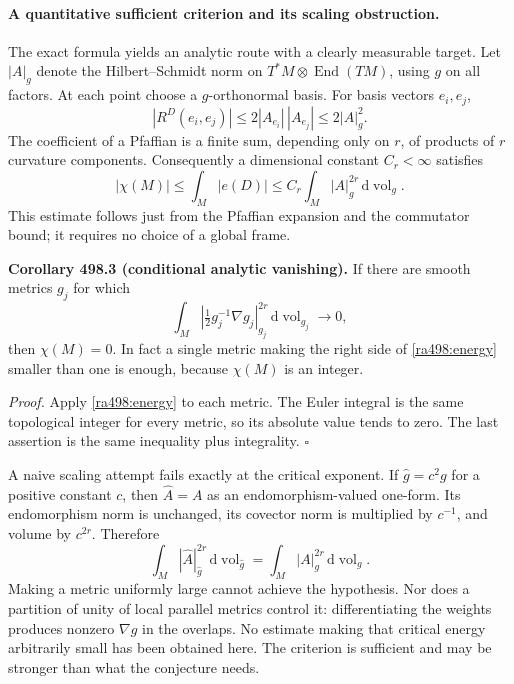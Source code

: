 \documentclass[11pt]{article}
\begin{document}
\paragraph{A quantitative sufficient criterion and its scaling obstruction.}
The exact formula yields an analytic route with a clearly measurable
target. Let $|A|_g$ denote the Hilbert--Schmidt norm on
$T^*M\otimes\operatorname{End}(TM)$, using $g$ on all factors. At each
point choose a $g$-orthonormal basis. For basis vectors $e_i,e_j$,
\[
 |R^D(e_i,e_j)|\le2|A_{e_i}|\,|A_{e_j}|\le2|A|_g^2.
\]
The coefficient of a Pfaffian is a finite sum, depending only on $r$, of
products of $r$ curvature components. Consequently a dimensional constant
$C_r<\infty$ satisfies
\begin{equation}\label{ra498:energy}
 |\chi(M)|\le\int_M|e(D)|
 \le C_r\int_M|A|_g^{2r}\,\mathrm d\operatorname{vol}_g.
\end{equation}
This estimate follows just from the Pfaffian expansion and the commutator
bound; it requires no choice of a global frame.

\textbf{Corollary 498.3 (conditional analytic vanishing).}
If there are smooth metrics $g_j$ for which
\[
 \int_M\left|\tfrac12g_j^{-1}\nabla g_j\right|_{g_j}^{2r}
       \,\mathrm d\operatorname{vol}_{g_j}\longrightarrow0,
\]
then $\chi(M)=0$. In fact a single metric making the right side of
\eqref{ra498:energy} smaller than one is enough, because $\chi(M)$ is
an integer.

\emph{Proof.}
Apply \eqref{ra498:energy} to each metric. The Euler integral is the same
topological integer for every metric, so its absolute value tends to zero.
The last assertion is the same inequality plus integrality.
\hfill$\square$

A naive scaling attempt fails exactly at the critical exponent. If
$\widehat g=c^2g$ for a positive constant $c$, then
$\widehat A=A$ as an endomorphism-valued one-form. Its endomorphism norm
is unchanged, its covector norm is multiplied by $c^{-1}$, and volume by
$c^{2r}$. Therefore
\[
 \int_M|\widehat A|_{\widehat g}^{2r}
       \,\mathrm d\operatorname{vol}_{\widehat g}
 =\int_M|A|_g^{2r}\,\mathrm d\operatorname{vol}_g.
\]
Making a metric uniformly large cannot achieve the hypothesis. Nor does
a partition of unity of local parallel metrics control it: differentiating
the weights produces nonzero $\nabla g$ in the overlaps. No estimate making
that critical energy arbitrarily small has been obtained here. The
criterion is sufficient and may be stronger than what the conjecture needs.
\end{document}
